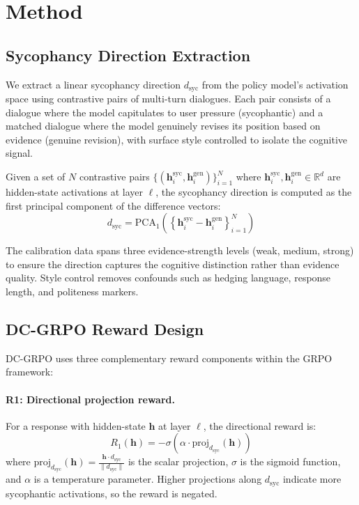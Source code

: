 \documentclass[11pt,a4paper]{article}
\newcommand{\dsyc}{$d_{\mathrm{syc}}$}
\begin{document}
\section{Method}
\label{sec:method}

\subsection{Sycophancy Direction Extraction}

We extract a linear sycophancy direction \dsyc{} from the policy model's activation space using contrastive pairs of multi-turn dialogues. Each pair consists of a dialogue where the model capitulates to user pressure (sycophantic) and a matched dialogue where the model genuinely revises its position based on evidence (genuine revision), with surface style controlled to isolate the cognitive signal.

Given a set of $N$ contrastive pairs $\{(\mathbf{h}_i^{\mathrm{syc}}, \mathbf{h}_i^{\mathrm{gen}})\}_{i=1}^{N}$ where $\mathbf{h}_i^{\mathrm{syc}}, \mathbf{h}_i^{\mathrm{gen}} \in \mathbb{R}^d$ are hidden-state activations at layer $\ell$, the sycophancy direction is computed as the first principal component of the difference vectors:
\begin{equation}
    d_{\mathrm{syc}} = \mathrm{PCA}_1\left(\left\{\mathbf{h}_i^{\mathrm{syc}} - \mathbf{h}_i^{\mathrm{gen}}\right\}_{i=1}^{N}\right)
\end{equation}

The calibration data spans three evidence-strength levels (weak, medium, strong) to ensure the direction captures the cognitive distinction rather than evidence quality. Style control removes confounds such as hedging language, response length, and politeness markers.

\subsection{DC-GRPO Reward Design}

DC-GRPO uses three complementary reward components within the GRPO framework:

\paragraph{R1: Directional projection reward.} For a response with hidden-state $\mathbf{h}$ at layer $\ell$, the directional reward is:
\begin{equation}
    R_1(\mathbf{h}) = -\sigma\left(\alpha \cdot \mathrm{proj}_{d_{\mathrm{syc}}}(\mathbf{h})\right)
\end{equation}
where $\mathrm{proj}_{d_{\mathrm{syc}}}(\mathbf{h}) = \frac{\mathbf{h} \cdot d_{\mathrm{syc}}}{\|d_{\mathrm{syc}}\|}$ is the scalar projection, $\sigma$ is the sigmoid function, and $\alpha$ is a temperature parameter. Higher projections along \dsyc{} indicate more sycophantic activations, so the reward is negated.
\end{document}

